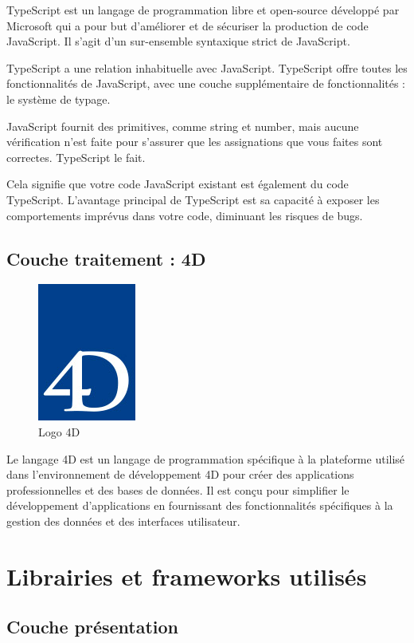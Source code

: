 TypeScript est un langage de programmation libre et open-source développé par Microsoft qui a pour but d'améliorer et de sécuriser la production de code JavaScript. Il s'agit d'un sur-ensemble syntaxique strict de JavaScript.

TypeScript a une relation inhabituelle avec JavaScript. TypeScript offre toutes les fonctionnalités de JavaScript, avec une couche supplémentaire de fonctionnalités : le système de typage.

JavaScript fournit des primitives, comme string et number, mais aucune vérification n’est faite pour s’assurer que les assignations que vous faites sont correctes. TypeScript le fait.

Cela signifie que votre code JavaScript existant est également du code TypeScript. L’avantage principal de TypeScript est sa capacité à exposer les comportements imprévus dans votre code, diminuant les risques de bugs.\cite{Typescript}

\subsection{Couche traitement : 4D}

\begin{figure}[H]
    \centering
    \includegraphics[scale=0.8]{Logos/Logo-4D.jpg}
    \caption{Logo 4D}
\end{figure}

Le langage 4D est un langage de programmation spécifique à la plateforme utilisé dans l’environnement de développement 4D pour créer des applications professionnelles et
des bases de données. Il est conçu pour simplifier le développement d’applications en fournissant des fonctionnalités
spécifiques à la gestion des données et des interfaces utilisateur.

\section{Librairies et frameworks utilisés}

\subsection{Couche présentation}

